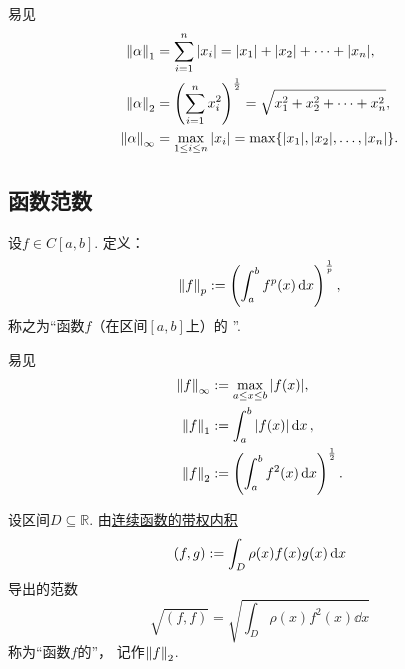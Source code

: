 易见\begin{align}
	\norm{\alpha}_1
	&= \sum_{i=1}^n \abs{x_i}
	= \abs{x_1} + \abs{x_2} + \dotsb + \abs{x_n}, \\
	\norm{\alpha}_2
	&= \left( \sum_{i=1}^n x_i^2 \right)^{\frac12}
	= \sqrt{x_1^2 + x_2^2 + \dotsb + x_n^2}, \\
	\norm{\alpha}_\infty
	&= \max_{1 \leq i \leq n} \abs{x_i}
	= \max\{\abs{x_1},\abs{x_2},\dotsc,\abs{x_n}\}.
\end{align}

\subsection{函数范数}
\begin{definition}%
设\(f \in C[a,b]\).
定义：\begin{equation}
	\norm{f}_p
	:=
	\left( \int_a^b f^p(x) \dd{x} \right)^{\frac1p},
\end{equation}
称之为“函数\(f\)（在区间\([a,b]\)上）的 ”.
\end{definition}

易见\begin{align}
	\norm{f}_\infty
	&:=
	\max_{a \leq x \leq b} \abs{f(x)},
		\label{equation:范数.连续函数的无穷范数} \\
	\norm{f}_1
	&:=
	\int_a^b \abs{f(x)} \dd{x}, \\
	\norm{f}_2
	&:=
	\left( \int_a^b f^2(x) \dd{x} \right)^{\frac12}.
		\label{equation:范数.连续函数的L2范数}
\end{align}

\begin{definition}\label{definition:范数.连续函数的带权范数}
设区间\(D \subseteq \mathbb{R}\).
由\hyperref[definition:欧几里得空间.连续函数的带权内积]{连续函数的带权内积}
\begin{equation*}
	(f,g)
	:=
	\int_D \rho(x) f(x) g(x) \dd{x}
\end{equation*}
导出的范数\begin{equation*}
	\sqrt{(f,f)}
	= \sqrt{
		\int_D \rho(x) f^2(x) \dd{x}
	}
\end{equation*}
称为“函数\(f\)的”，
记作\(\norm{f}_2\).
\end{definition}


